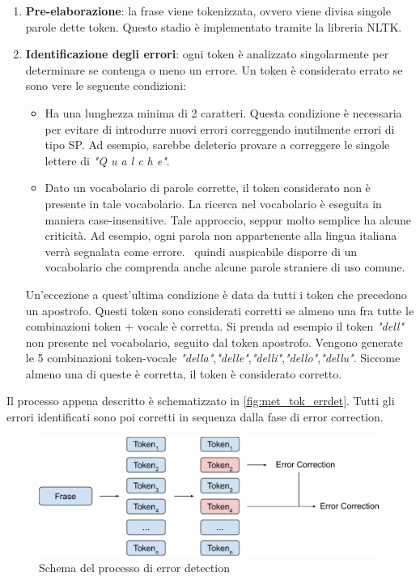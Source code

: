\begin{enumerate}
\item \textbf{Pre-elaborazione}: la frase viene tokenizzata, ovvero viene divisa singole parole dette token. Questo stadio è implementato tramite la libreria NLTK\cite{nltk}.
\item \textbf{Identificazione degli errori}: ogni token è analizzato singolarmente per determinare se contenga o meno un errore. Un token è considerato errato se sono vere le seguente condizioni:
	\begin{itemize}
	\item Ha una lunghezza minima di 2 caratteri. Questa condizione è necessaria per evitare di introdurre nuovi errori correggendo inutilmente errori di tipo SP. Ad esempio, sarebbe deleterio provare a correggere le singole lettere di \textit{"Q u a l c h e"}.
	\item Dato un vocabolario di parole corrette, il token considerato non è presente in tale vocabolario. La ricerca nel vocabolario è eseguita in maniera case-insensitive. Tale approccio, seppur molto semplice ha alcune criticità. Ad esempio, ogni parola non appartenente alla lingua italiana verrà segnalata come errore. \E\ quindi auspicabile disporre di un vocabolario che comprenda anche alcune parole straniere di uso comune.
	\end{itemize}
Un'eccezione a quest'ultima condizione è data da tutti i token che precedono un apostrofo. Questi token sono considerati corretti se almeno una fra tutte le combinazioni token + vocale è corretta. Si prenda ad esempio il token \textit{"dell"} non presente nel vocabolario, seguito dal token apostrofo. Vengono generate le 5 combinazioni token-vocale \textit{"della"},\textit{"delle"},\textit{"delli"},\textit{"dello"},\textit{"dellu"}. Siccome almeno una di queste è corretta, il token è considerato corretto.
\end{enumerate}

Il processo appena descritto è schematizzato in \autoref{fig:met_tok_errdet}. Tutti gli errori identificati sono poi corretti in sequenza dalla fase di error correction. 

\begin{figure}[H]
\centering
\includegraphics[width=\textwidth]{immagini/metodologia/error_detection}
\caption{Schema del processo di error detection}
\label{fig:met_tok_errdet}
\end{figure}

